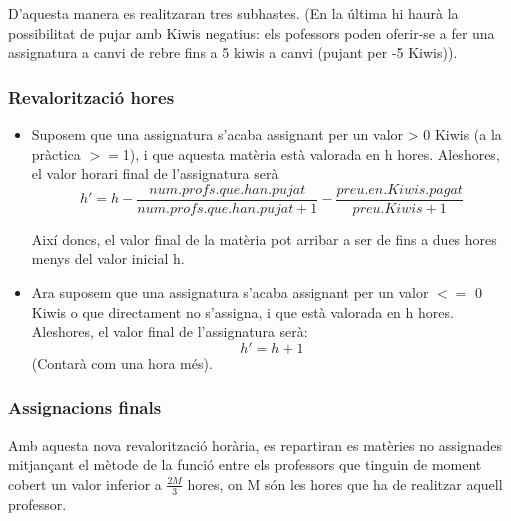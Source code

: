 \documentclass[a4paper,12pt]{article}
\begin{document}
D'aquesta manera es realitzaran tres subhastes. (En la última hi haurà la possibilitat de pujar amb Kiwis negatius: els pofessors poden oferir-se a fer una assignatura a canvi de rebre fins a 5 kiwis a canvi (pujant per -5 Kiwis)).


\subsubsection{Revalorització hores}

\begin{itemize}
    \item Suposem que una assignatura s'acaba assignant per un valor > 0 Kiwis (a la pràctica $>=$1), i que aquesta matèria està valorada en h hores. Aleshores, el valor horari final de l'assignatura serà $$ h' = h - \frac{num. profs. que. han. pujat}{num. profs. que. han. pujat + 1} - \frac{preu. en. Kiwis. pagat}{preu. Kiwis +1}$$
    
    Així doncs, el valor final de la matèria pot arribar a ser de fins a dues hores menys del valor inicial h.
    
    \item Ara suposem que una assignatura s'acaba assignant per un valor $<= $ 0 Kiwis o que directament no s'assigna, i que està valorada en h hores. Aleshores, el valor final de l'assignatura serà: $$h'= h +1 $$
    (Contarà com una hora més).
\end{itemize}

\subsubsection{Assignacions finals}

Amb aquesta nova revalorització horària, es repartiran es matèries no assignades mitjançant el mètode de la funció entre els professors que tinguin de moment cobert un valor inferior a $\frac{2M}{3}$ hores, on M són les hores que ha de realitzar aquell professor.
\end{document}
